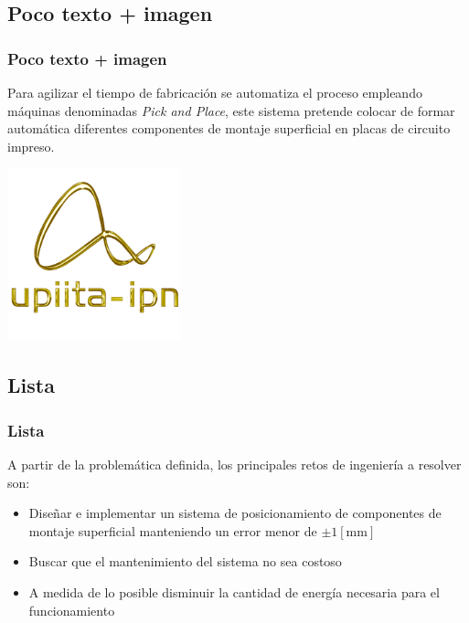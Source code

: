 	\begin{frame}
		\section{Poco texto + imagen}
		\frametitle{Poco texto + imagen}
		Para agilizar el tiempo de fabricación se automatiza el proceso empleando máquinas denominadas \textit{Pick and Place}, este sistema pretende colocar de formar automática diferentes componentes de montaje superficial en placas de circuito impreso.
		
		\begin{center}
			\includegraphics[height=50mm]{images/logo_upiita_oro}
		\end{center}
	\end{frame}
	\begin{frame}
		\section{Lista}
		\frametitle{Lista}
		A partir de la problemática definida, los principales retos de ingeniería a resolver son:
		\begin{itemize}
			\item Diseñar e implementar un sistema de posicionamiento de componentes de montaje superficial manteniendo un error menor de $ \pm 1 [\si {\milli \meter}] $
			\item Buscar que el mantenimiento del sistema no sea costoso
			\item A medida de lo posible disminuir la cantidad de energía necesaria para el funcionamiento
		\end{itemize}
	
	\end{frame}
